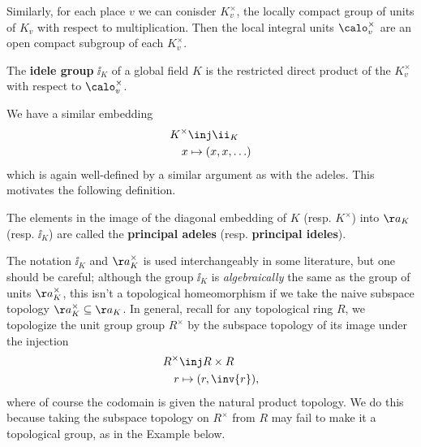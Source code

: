 \documentclass[11pt, x11names, openany]{book}
\begin{document}
Similarly, for each place $v$ we can conisder $K_v^\times$, the locally compact group of units of $K_v$ with respect to multiplication. Then the local integral units $\calo_v^\times$ are an open compact subgroup of each $K_v^\times$.
\begin{defn}
The \textbf{idele group} $\ii_K$ of a global field $K$ is the restricted direct product of the $K_v^\times$ with respect to $\calo_v^\times$.
\end{defn}

We have a similar embedding
\begin{equation*}
    \begin{split}
    K^\times &\inj \ii_K\\
    x &\mapsto (x, x, \ldots)
    \end{split}
\end{equation*}
which is again well-defined by a similar argument as with the adeles. This motivates the following definition.

\begin{defn}
\label{def: principal adeles}
The elements in the image of the diagonal embedding of $K$ (resp. $K^\times$) into $\aa_K$ (resp. $\ii_K$) are called the \textbf{principal adeles} (resp. \textbf{principal ideles}).
\end{defn}


\begin{warning}
The notation $\ii_K$ and $\aa^\times_K$ is used interchangeably in some literature, but one should be careful; although the group $\ii_K$ is \textit{algebraically} the same as the group of units $\aa_K^\times$, this isn't a topological homeomorphism if we take the naive subspace topology $\aa_K^\times \subseteq \aa_K$. In general, recall for any topological ring $R$, we topologize the unit group group $R^\times$ by the subspace topology of its image under the injection
\begin{align*}
R^\times &\inj R \times R\\
r &\mapsto (r, \inv{r}),
\end{align*}
where of course the codomain is given the natural product topology. We do this because taking the subspace topology on $R^\times$ from $R$ may fail to make it a topological group, as in the Example below.
\end{warning}
\end{document}
